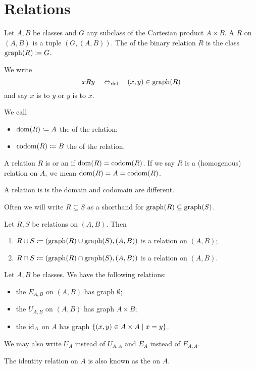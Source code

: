 \section{Relations}
\begin{definition}
Let $A,B$ be classes and $G$ any subclass of the Cartesian product $A\times B$. A  $R$ on $(A, B)$ is a tuple $(G,(A,B))$. The  of the binary relation $R$ is the class $\operatorname{graph}(R) \coloneqq G$.

We write
\[ xRy \quad\Leftrightarrow_{\text{def}}\quad (x,y)\in \operatorname{graph}(R) \]
and say $x$ is  to $y$ or $y$ is  to $x$.

We call
\begin{itemize}
\item $\operatorname{dom}(R) \coloneqq A$ the  of the relation;
\item $\operatorname{codom}(R) \coloneqq B$ the  of the relation.
\end{itemize}
A relation $R$ is  or an  if $\operatorname{dom}(R) = \operatorname{codom}(R)$.
If we say $R$ is a (homogenous) relation on $A$, we mean $\operatorname{dom}(R) = A = \operatorname{codom}(R)$. 

A relation is  is the domain and codomain are different.
\end{definition}

Often we will write $R \subseteq S$ as a shorthand for $\operatorname{graph}(R)\subseteq \operatorname{graph}(S)$.

\begin{lemma}
Let $R,S$ be relations on $(A,B)$. Then
\begin{enumerate}
\item $R\cup S \coloneqq \left( \operatorname{graph}(R)\cup \operatorname{graph}(S), (A,B) \right)$ is a relation on $(A,B)$;
\item $R\cap S \coloneqq \left( \operatorname{graph}(R)\cap \operatorname{graph}(S), (A,B) \right)$ is a relation on $(A,B)$.
\end{enumerate}
\end{lemma}

\begin{definition}
Let $A,B$ be classes. We have the following relations:
\begin{itemize}
\item the  $E_{A,B}$ on $(A, B)$ has graph $\emptyset$;
\item the  $U_{A,B}$ on $(A, B)$ has graph $A\times B$;
\item the  $\operatorname{id}_A$ on $A$ has graph $\left\{ (x,y)\in A\times A \;\middle|\; x=y \right\}$.
\end{itemize}
We may also write $U_A$ instead of $U_{A,A}$ and $E_A$ instead of $E_{A,A}$.
\end{definition}
The identity relation on $A$ is also known as the  on $A$.

